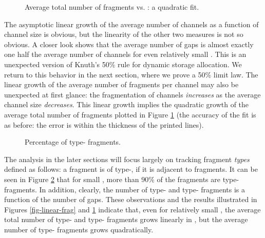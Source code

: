 \documentclass{amsart}
\begin{document}
\begin{figure}[t]
\begin{center}
 \caption{Average total number of fragments vs. : a quadratic fit.}
 \label{fig-quad-frag}
\end{center}
\end{figure}
The asymptotic linear growth of the average number of channels as a
function of channel size is obvious, but the linearity of the other
two measures is not so obvious.  A closer look shows that the
average number of gaps is almost exactly one half the average number
of channels for even relatively small . This is an
unexpected version of Knuth's 50\% rule for dynamic storage
allocation.  We return to this behavior in the next section, where
we prove a 50\% limit law.
The linear growth of the average number of fragments
per channel may also be unexpected at
first glance:  the fragmentation of channels  {\it increases}
as the  average channel size
{\it decreases}.   This linear growth  implies the
quadratic  growth of the  average total
number of fragments plotted in Figure \ref{fig-quad-frag}
(the accuracy of the fit is as
before: the  error is within the  thickness of the  printed lines).


\begin{figure}[!t]
\begin{center}
 \caption{Percentage of type- fragments.}
 \label{fig:frag-type}
\end{center}
\end{figure}

The analysis in the later
sections  will focus  largely  on tracking  fragment  {\em types}  defined  as follows:  a
fragment  is of  type-, if  it is  adjacent to    fragments. It can be seen in Figure \ref{fig:frag-type} that for small , more than 90\% of the fragments are type- fragments. In addition, clearly, the number of type- and type- fragments is a function of the number of gaps. These observations and the  results illustrated in
Figures \ref{fig-linear-frag} and \ref{fig-quad-frag} indicate that, even for relatively
small , the average total number  of type- and type- fragments grows linearly in
, but the average number of type- fragments grows quadratically.
\end{document}
